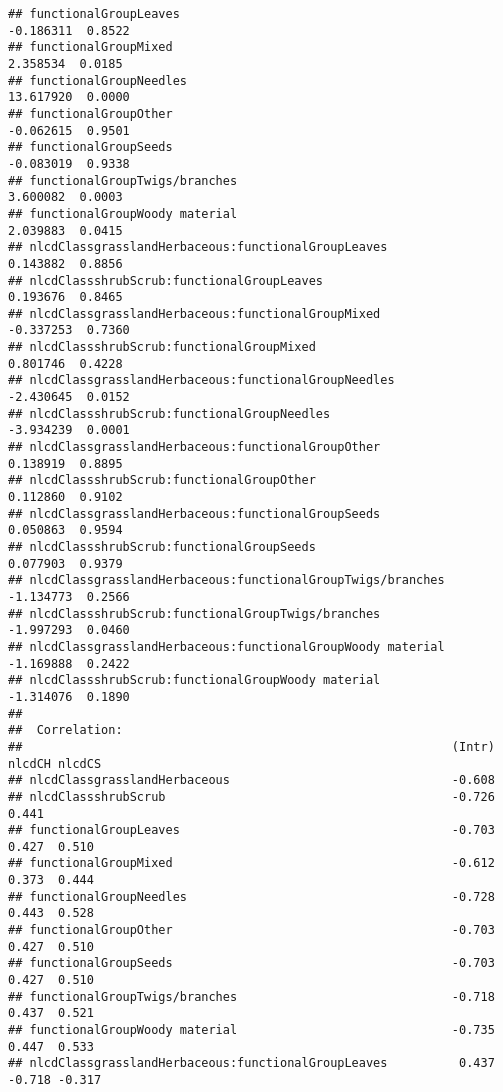 \documentclass[]{article}
\begin{document}
\begin{verbatim}
## functionalGroupLeaves                                      -0.186311  0.8522
## functionalGroupMixed                                        2.358534  0.0185
## functionalGroupNeedles                                     13.617920  0.0000
## functionalGroupOther                                       -0.062615  0.9501
## functionalGroupSeeds                                       -0.083019  0.9338
## functionalGroupTwigs/branches                               3.600082  0.0003
## functionalGroupWoody material                               2.039883  0.0415
## nlcdClassgrasslandHerbaceous:functionalGroupLeaves          0.143882  0.8856
## nlcdClassshrubScrub:functionalGroupLeaves                   0.193676  0.8465
## nlcdClassgrasslandHerbaceous:functionalGroupMixed          -0.337253  0.7360
## nlcdClassshrubScrub:functionalGroupMixed                    0.801746  0.4228
## nlcdClassgrasslandHerbaceous:functionalGroupNeedles        -2.430645  0.0152
## nlcdClassshrubScrub:functionalGroupNeedles                 -3.934239  0.0001
## nlcdClassgrasslandHerbaceous:functionalGroupOther           0.138919  0.8895
## nlcdClassshrubScrub:functionalGroupOther                    0.112860  0.9102
## nlcdClassgrasslandHerbaceous:functionalGroupSeeds           0.050863  0.9594
## nlcdClassshrubScrub:functionalGroupSeeds                    0.077903  0.9379
## nlcdClassgrasslandHerbaceous:functionalGroupTwigs/branches -1.134773  0.2566
## nlcdClassshrubScrub:functionalGroupTwigs/branches          -1.997293  0.0460
## nlcdClassgrasslandHerbaceous:functionalGroupWoody material -1.169888  0.2422
## nlcdClassshrubScrub:functionalGroupWoody material          -1.314076  0.1890
## 
##  Correlation: 
##                                                            (Intr) nlcdCH nlcdCS
## nlcdClassgrasslandHerbaceous                               -0.608              
## nlcdClassshrubScrub                                        -0.726  0.441       
## functionalGroupLeaves                                      -0.703  0.427  0.510
## functionalGroupMixed                                       -0.612  0.373  0.444
## functionalGroupNeedles                                     -0.728  0.443  0.528
## functionalGroupOther                                       -0.703  0.427  0.510
## functionalGroupSeeds                                       -0.703  0.427  0.510
## functionalGroupTwigs/branches                              -0.718  0.437  0.521
## functionalGroupWoody material                              -0.735  0.447  0.533
## nlcdClassgrasslandHerbaceous:functionalGroupLeaves          0.437 -0.718 -0.317

\end{verbatim}
\end{document}
